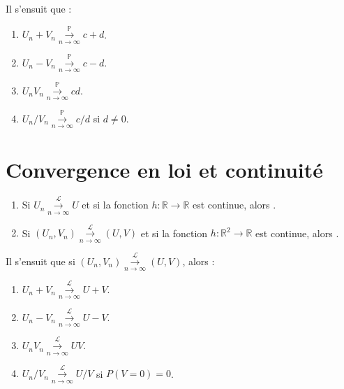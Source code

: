 \documentclass[10pt, french]{report}
\begin{document}
\begin{multicols*}{2}
\begin{definitionNOHFILL}[Proposition]
\bigskip

Il s'ensuit que : 
\begin{enumerate}
	\item	$U_{n} + V_{n} \overset{\mathbb{P}}{\underset{n \rightarrow \infty}{\longrightarrow}} c + d$.
	\item	$U_{n} - V_{n} \overset{\mathbb{P}}{\underset{n \rightarrow \infty}{\longrightarrow}} c - d$.
	\item	$U_{n} V_{n} \overset{\mathbb{P}}{\underset{n \rightarrow \infty}{\longrightarrow}} c d$.
	\item	$U_{n} / V_{n} \overset{\mathbb{P}}{\underset{n \rightarrow \infty}{\longrightarrow}} c / d$ si $d \neq 0$.
\end{enumerate}
\end{definitionNOHFILL}


\columnbreak
\section{Convergence en loi et continuité}
\begin{enumerate}
	\item	Si $U_{n} \overset{\mathcal{L}}{\underset{n \rightarrow \infty}{\longrightarrow}} U$ et si la fonction $h: \mathbb{R} \rightarrow \mathbb{R}$ est continue, alors .
	\item	Si $(U_{n}, V_{n}) \overset{\mathcal{L}}{\underset{n \rightarrow \infty}{\longrightarrow}} (U, V)$ et si la fonction $h: \mathbb{R}^{2} \rightarrow \mathbb{R}$ est continue, alors .
\end{enumerate}


Il s'ensuit que si $(U_{n}, V_{n}) \overset{\mathcal{L}}{\underset{n \rightarrow \infty}{\longrightarrow}} (U, V)$, alors :
\begin{enumerate}
	\item	$U_{n} + V_{n} \overset{\mathcal{L}}{\underset{n \rightarrow \infty}{\longrightarrow}} U + V$.
	\item	$U_{n} - V_{n} \overset{\mathcal{L}}{\underset{n \rightarrow \infty}{\longrightarrow}} U - V$.
	\item	$U_{n} V_{n} \overset{\mathcal{L}}{\underset{n \rightarrow \infty}{\longrightarrow}} U V$.
	\item	$U_{n} / V_{n} \overset{\mathcal{L}}{\underset{n \rightarrow \infty}{\longrightarrow}} U / V$ si $P(V = 0) = 0$.
\end{enumerate}




\end{multicols*}
\end{document}
